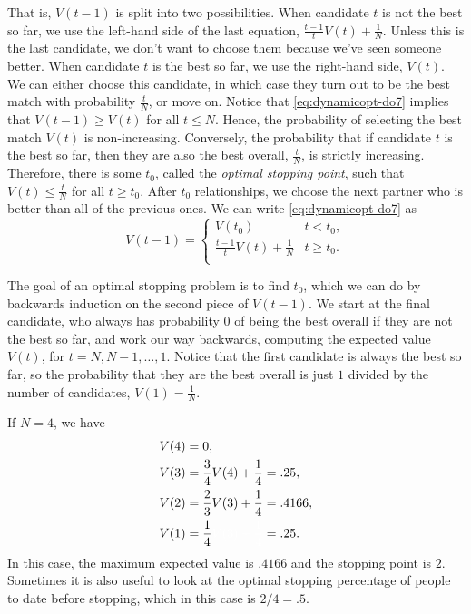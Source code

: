 That is, $V(t-1)$ is split into two possibilities.
When candidate $t$ is not the best so far, we use the left-hand side of the last equation, $\frac{t-1}{t}V(t)+\frac{1}{N}$.
Unless this is the last candidate, we don't want to choose them because we've seen someone better.
When candidate $t$ is the best so far, we use the right-hand side, $V(t)$.
We can either choose this candidate, in which case they turn out to be the best match with probability $\frac{t}{N}$, or move on.
Notice that \eqref{eq:dynamicopt-do7} implies that $V(t-1)\geq V(t)$ for all $t\leq N$.
Hence, the probability of selecting the best match $V(t)$ is non-increasing.
Conversely, the probability that if candidate $t$ is the best so far, then they are also the best overall, $\frac{t}{N}$, is strictly increasing.
Therefore, there is some $t_0$, called the \emph{optimal stopping point}, such that $V(t)\leq\frac{t}{N}$ for all $t\geq t_0$.
After $t_0$ relationships, we choose the next partner who is better than all of the previous ones.
We can write \eqref{eq:dynamicopt-do7} as
\[
V(t-1) =
    \begin{cases}
    V(t_0) & t<t_0,\\
    \frac{t-1}{t}V(t)+\frac{1}{N} & t\geq t_0.\\
    \end{cases}
\]

The goal of an optimal stopping problem is to find $t_0$, which we can do by backwards induction on the second piece of $V(t-1)$.
We start at the final candidate, who always has probability $0$ of being the best overall if they are not the best so far, and work our way backwards, computing the expected value $V(t)$, for $t=N,N-1,\ldots,1$.
Notice that the first candidate is always the best so far, so the probability that they are the best overall is just $1$ divided by the number of candidates, $V(1) = \frac{1}{N}$.

If $N=4$, we have
\begin{align*}
V(4) &= 0, \\
V(3) &= \frac{3}{4}V(4)+\frac{1}{4} = .25,\\
V(2) &= \frac{2}{3}V(3)+\frac{1}{4} = .4166,\\
V(1) &= \frac{1}{4}\textcolor{white}{V(3)+\frac{1}{4}} = .25.
\end{align*}
In this case, the maximum expected value is $.4166$ and the stopping point is $2$.
Sometimes it is also useful to look at the optimal stopping percentage of people to date before stopping, which in this case is $2/4=.5$.

